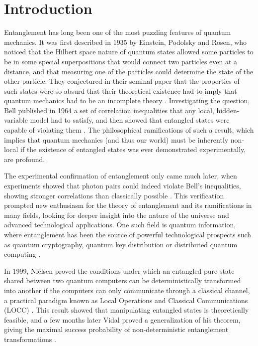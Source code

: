 \chapter*{Introduction}

Entanglement has long been one of the most puzzling features of quantum mechanics. It was first described in 1935 by Einstein, Podolsky and Rosen, who noticed that the Hilbert space nature of quantum states allowed some particles to be in some special superpositions that would connect two particles even at a distance, and that measuring one of the particles could determine the state of the other particle. They conjectured in their seminal paper that the properties of such states were so absurd that their theoretical existence had to imply that quantum mechanics had to be an incomplete theory \cite{einstein_can_1935}. Investigating the question, Bell published in 1964 a set of correlation inequalities that any local, hidden-variable model had to satisfy, and then showed that entangled states were capable of violating them \cite{bell_einstein_1964}. The philosophical ramifications of such a result, which implies that quantum mechanics (and thus our world) must be inherently non-local if the existence of entangled states was ever demonstrated experimentally, are profound.

The experimental confirmation of entanglement only came much later, when experiments showed that photon pairs could indeed violate Bell's inequalities, showing stronger correlations than classically possible \cite{aspect_experimental_1982}. This verification prompted new enthusiasm for the theory of entanglement and its ramifications in many fields, looking for deeper insight into the nature of the universe and advanced technological applications. One such field is quantum information, where entanglement has been the source of powerful technological prospects such as quantum cryptography, quantum key distribution or distributed quantum computing \cite{horodecki_quantum_2009}.

In 1999, Nielsen proved the conditions under which an entangled pure state shared between two quantum computers can be deterministically transformed into another if the computers can only communicate through a classical channel, a practical paradigm known as Local Operations and Classical Communications (LOCC) \cite{nielsen_conditions_1999}. This result showed that manipulating entangled states is theoretically feasible, and a few months later Vidal proved a generalization of his theorem, giving the maximal success probability of non-deterministic entanglement transformations \cite{vidal_entanglement_1999}. 

